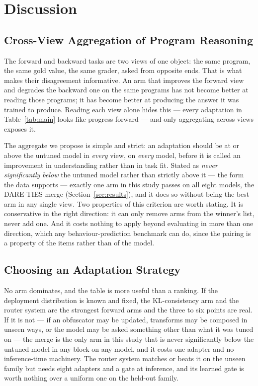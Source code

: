 \section{Discussion}
\label{sec:discussion}

\subsection{Cross-View Aggregation of Program Reasoning}
The forward and backward tasks are two views of one object: the same program, the same gold value,
the same grader, asked from opposite ends. That is what makes their disagreement informative. An arm
that improves the forward view and degrades the backward one on the same programs has not become
better at reading those programs; it has become better at producing the answer it was trained to
produce. Reading each view alone hides this --- every adaptation in Table~\ref{tab:main} looks like
progress forward --- and only aggregating across views exposes it.

The aggregate we propose is simple and strict: an adaptation should be at or above the untuned model
in \emph{every} view, on \emph{every} model, before it is called an improvement in understanding
rather than in task fit. Stated as \emph{never significantly below} the untuned model rather than strictly above it --- the
form the data supports --- exactly one arm in this study passes on all eight models, the DARE-TIES
merge (Section~\ref{sec:results}), and it does so without being the best arm in any single view. Two properties of this criterion are worth stating. It is conservative in the
right direction: it can only remove arms from the winner's list, never add one. And it costs nothing
to apply beyond evaluating in more than one direction, which any behaviour-prediction benchmark can
do, since the pairing is a property of the items rather than of the model.

\subsection{Choosing an Adaptation Strategy}

No arm dominates, and the table is more useful than a ranking. If the deployment distribution is known
and fixed, the KL-consistency arm and the router system are the strongest forward arms and the three to six
points are real. If it is not --- if an obfuscator may be updated, transforms may be composed in
unseen ways, or the model may be asked something other than what it was tuned on --- the merge is the
only arm in this study that is never significantly below the untuned model in any block on any model,
and it costs one adapter and no inference-time machinery. The router system matches or beats it on the unseen
family but needs eight adapters and a gate at inference, and its learned gate is worth nothing over a
uniform one on the held-out family.

